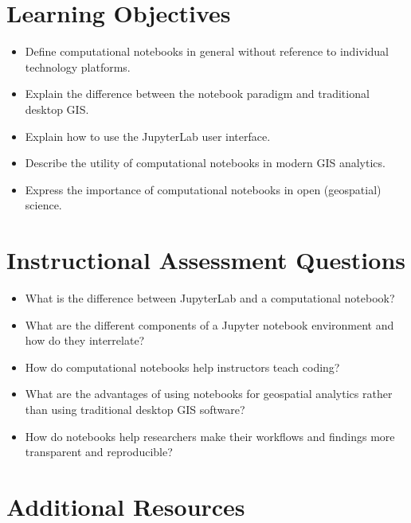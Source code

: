 \documentclass[11pt,letterpaper]{article}
\begin{document}
\section*{Learning Objectives}

\begin{itemize}
    \item Define computational notebooks in general without reference to individual technology platforms.
    \item Explain the difference between the notebook paradigm and traditional desktop GIS.
    \item Explain how to use the JupyterLab user interface.
    \item Describe the utility of computational notebooks in modern GIS analytics.
    \item Express the importance of computational notebooks in open (geospatial) science.
\end{itemize}

\section*{Instructional Assessment Questions}

\begin{itemize}
    \item What is the difference between JupyterLab and a computational notebook?
    \item What are the different components of a Jupyter notebook environment and how do they interrelate?
    \item How do computational notebooks help instructors teach coding?
    \item What are the advantages of using notebooks for geospatial analytics rather than using traditional desktop GIS software?
    \item How do notebooks help researchers make their workflows and findings more transparent and reproducible?
\end{itemize}

\section*{Additional Resources}
\end{document}
